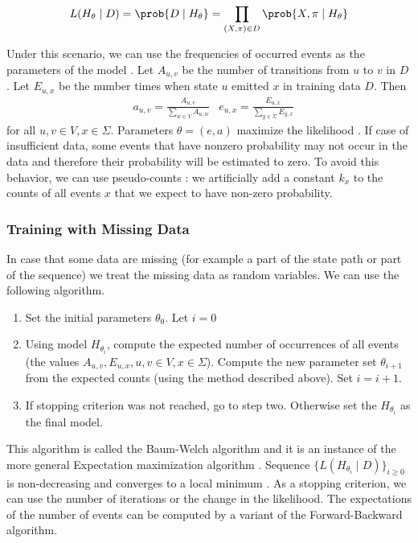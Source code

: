 \[L(H_\theta\mid D)=\prob{D\mid H_\theta}= \prod_{(X,\pi)\in D}\prob{X,\pi\mid H_\theta}\]

Under this scenario, we can use the frequencies of occurred events as the parameters of the model \cite{Durbin1998}.
Let $A_{u,v}$ be the number of transitions from $u$ to $v$ in $D$.
Let $E_{u,x}$ be the number times when state $u$ emitted $x$ in training data
$D$.
Then 
\begin{align*}
&a_{u,v}=\frac{A_{u,v}}{\sum_{w\in V}A_{u,w}}
&e_{u,x}=\frac{E_{u,x}}{\sum_{y\in\Sigma}E_{y,x}}
\end{align*}
for all $u,v\in V, x\in\Sigma$. Parameters $\theta=(e,a)$ maximize the likelihood
\cite{Durbin1998}. If case of insufficient data, some events that have
nonzero probability may not occur in the data and therefore their probability will be
estimated to zero. To avoid this behavior, we can use pseudo-counts
\cite{Durbin1998}: we artificially add a constant $k_x$ to the counts of all
events $x$ that we expect to have non-zero probability.

\subsubsection{Training with Missing Data} 
In case that some data are missing (for example a part
of the state path or part of the sequence) we treat the missing data as random
variables. We can use the following algorithm. 
\begin{enumerate}[itemsep=-1mm]
\item  Set the initial parameters $\theta_0$. Let $i=0$
\item  Using model $H_{\theta_i}$, compute the expected number of occurrences of
all events (the values $A_{u,v}, E_{u,x}, u,v\in V,x\in\Sigma$). Compute the new
parameter set $\theta_{i+1}$ from the expected counts (using the method
described above). Set $i=i+1$.
\item If stopping criterion was not reached, go to step two. Otherwise 
set the $H_{\theta_{i}}$ as the final model.
\end{enumerate}
This algorithm is called the Baum-Welch algorithm and it is an instance of the
more general Expectation maximization algorithm \cite{Durbin1998}. Sequence $\{L(H_{\theta_i}\mid D)\}_{i\geq 0}$ is non-decreasing and
 converges to a local minimum \cite{Durbin1998}. As a stopping criterion,
we can use the number of iterations or the change in the likelihood.
 The expectations of the number of events can be
computed by a variant of the Forward-Backward algorithm.

